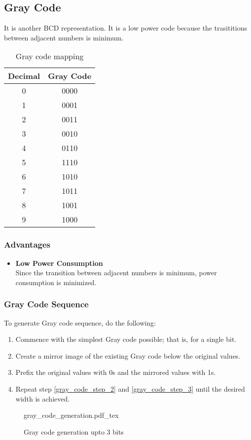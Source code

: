 \documentclass[oneside]{book}
\newcommand{\incfig}[1]{%
    {#1.pdf_tex}
}
\begin{document}
\subsection{Gray Code}
It is another BCD representation. It is a low power code because the trasititions between adjacent numbers is minimum.
\begin{table}[ht]
	\centering
	\begin{tabular}{|cc|}
		\hline
		Decimal & Gray Code \\
		\hline
		0       & 0000      \\
		1       & 0001      \\
		2       & 0011      \\
		3       & 0010      \\
		4       & 0110      \\
		5       & 1110      \\
		6       & 1010      \\
		7       & 1011      \\
		8       & 1001      \\
		9       & 1000      \\
		\hline
	\end{tabular}
	\caption{Gray code mapping}
\end{table}
\subsubsection{Advantages}
\begin{itemize}
	\item \textbf{Low Power Consumption}\\
	      Since the transition between adjacent numbers is minimum, power consumption is minimized.
\end{itemize}
\subsubsection{Gray Code Sequence}
To generate Gray code sequence, do the following\cite{gray_code_generation}:
\begin{enumerate}
	\item Commence with the simplest Gray code possible; that is, for a single bit.
	\item Create a mirror image of the existing Gray code below the original values.
	      \label{gray_code_step_2}
	\item Prefix the original values with 0s and the mirrored values with 1s.
	      \label{gray_code_step_3}
	\item Repeat step \ref{gray_code_step_2} and \ref{gray_code_step_3} until the desired width is achieved.
\end{enumerate}
\begin{figure}[H]
	\centering
	\incfig{gray_code_generation}
	\caption{Gray code generation upto 3 bits}
	\label{gray_code_generation}
\end{figure}
\end{document}

